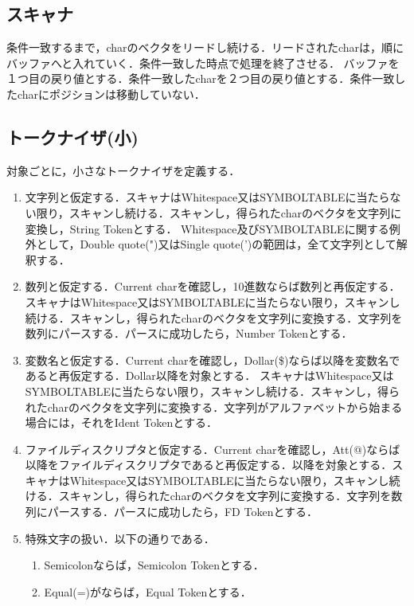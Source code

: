 \documentclass{article}
\begin{document}
\subsection{スキャナ}
条件一致するまで，charのベクタをリードし続ける．リードされたcharは，順にバッファへと入れていく．条件一致した時点で処理を終了させる．\newline
バッファを１つ目の戻り値とする．条件一致したcharを２つ目の戻り値とする．条件一致したcharにポジションは移動していない．

\subsection{トークナイザ(小)}
対象ごとに，小さなトークナイザを定義する．
    \begin{enumerate}
        \item 文字列と仮定する．スキャナはWhitespace又はSYMBOLTABLEに当たらない限り，スキャンし続ける．スキャンし，得られたcharのベクタを文字列に変換し，String Tokenとする．\newline
        Whitespace及びSYMBOLTABLEに関する例外として，Double quote(")又はSingle quote(')の範囲は，全て文字列として解釈する．
        \item 数列と仮定する．Current charを確認し，10進数ならば数列と再仮定する．スキャナはWhitespace又はSYMBOLTABLEに当たらない限り，スキャンし続ける．スキャンし，得られたcharのベクタを文字列に変換する．文字列を数列にパースする．パースに成功したら，Number Tokenとする．
        \item 変数名と仮定する．Current charを確認し，Dollar(\$)ならば以降を変数名であると再仮定する．Dollar以降を対象とする．
        スキャナはWhitespace又はSYMBOLTABLEに当たらない限り，スキャンし続ける．スキャンし，得られたcharのベクタを文字列に変換する．文字列がアルファベットから始まる場合には，それをIdent Tokenとする．
        \item ファイルディスクリプタと仮定する．Current charを確認し，Att(@)ならば以降をファイルディスクリプタであると再仮定する．以降を対象とする．スキャナはWhitespace又はSYMBOLTABLEに当たらない限り，スキャンし続ける．スキャンし，得られたcharのベクタを文字列に変換する．文字列を数列にパースする．パースに成功したら，FD Tokenとする．
        \item 特殊文字の扱い．以下の通りである．
            \begin{enumerate}
                \item Semicolonならば，Semicolon Tokenとする．
                \item Equal(=)がならば，Equal Tokenとする．

\end{enumerate}
\end{enumerate}
\end{document}
